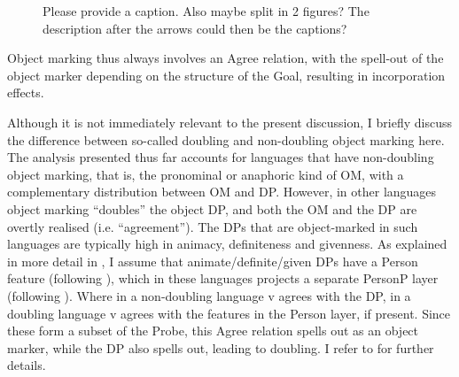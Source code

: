 \documentclass[output=paper
,modfonts
,nonflat]{langsci/langscibook}
\begin{document}
\begin{figure} 
	\caption{\color{red}Please provide a caption. Also maybe split in 2 figures? The description after the arrows could then be the captions?\label{ex-vdwal:13}}
	\begin{exe}
	\end{exe}
\end{figure}

Object marking thus always involves an Agree relation, with the spell-out of the object marker depending on the structure of the Goal, resulting in incorporation effects.

Although it is not immediately relevant to the present discussion, I briefly discuss the difference between so-called doubling and non-doubling object marking here. The analysis presented thus far accounts for languages that have non-doubling object marking, that is, the pronominal or anaphoric kind of OM, with a complementary distribution between OM and DP. However, in other languages object marking ``doubles'' the object DP, and both the OM and the DP are overtly realised (i.e. ``agreement''). The DPs that are object-marked in such languages are typically high in animacy, definiteness and givenness. As explained in more detail in \citet{Van_der_Wal2015}, I assume that animate/definite/given DPs have a Person feature (following \citealt{Richards2008, Richards2015}), which in these languages projects a separate PersonP layer (following \citealt{Hoehn2017}).  
Where in a non-doubling language v agrees with the DP, in a doubling language v agrees with the features in the Person layer, if present. Since these form a subset of the Probe, this Agree relation spells out as an object marker, while the DP also spells out, leading to doubling. I refer to \citet{Van_der_Wal2015} for further details.\largerpage
\end{document}
